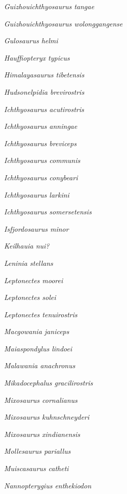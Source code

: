\emph{Guizhouichthyosaurus tangae} \cite{Yin2000GG}

\emph{Guizhouichthyosaurus wolonggangense} \cite{Chen2007GC}

\emph{Gulosaurus helmi} \cite{Cuthbertson2013JVP}

\emph{Hauffiopteryx typicus} \cite{Maisch2008P}

\emph{Himalayasaurus tibetensis} \cite{Young1972MNIGP}

\emph{Hudsonelpidia brevirostris} \cite{McGowan1995CJES}

\emph{Ichthyosaurus acutirostris} \cite{Owen1840RBAAS}

\emph{Ichthyosaurus anningae} \cite{Lomax2015JVP}

\emph{Ichthyosaurus breviceps} \cite{Owen1881MPS}

\emph{Ichthyosaurus communis} \cite{Conybeare1822TGSL}

\emph{Ichthyosaurus conybeari} \cite{Lydekker1888GM}

\emph{Ichthyosaurus larkini} \cite{Lomax2017PP}

\emph{Ichthyosaurus somersetensis} \cite{Lomax2017PP}

\emph{Isfjordosaurus minor} \cite{Wiman1910BGIUa}

\emph{Keilhauia nui?} \cite{Delsett2017PO}

\emph{Leninia stellans} \cite{Fischer2014GM}

\emph{Leptonectes moorei} \cite{McGowan1999P}

\emph{Leptonectes solei} \cite{McGowan1993CJES}

\emph{Leptonectes tenuirostris} \cite{Conybeare1822TGSL}

\emph{Macgowania janiceps} \cite{McGowan1996CJES}

\emph{Maiaspondylus lindoei} \cite{Maxwell2006P}

\emph{Malawania anachronus} \cite{Fischer2013BL}

\emph{Mikadocephalus gracilirostris} \cite{Maisch1997PZ}

\emph{Mixosaurus cornalianus} \cite{Bassani1886ASISN}

\emph{Mixosaurus kuhnschneyderi} \cite{Brinkmann1998NJGPA}

\emph{Mixosaurus xindianensis} \cite{Chen2010APS}

\emph{Mollesaurus pariallus} \cite{Fernandez1999JP}

\emph{Muiscasaurus catheti} \cite{Maxwell2016PP}

\emph{Nannopterygius enthekiodon} \cite{Hulke1871QJGS}

